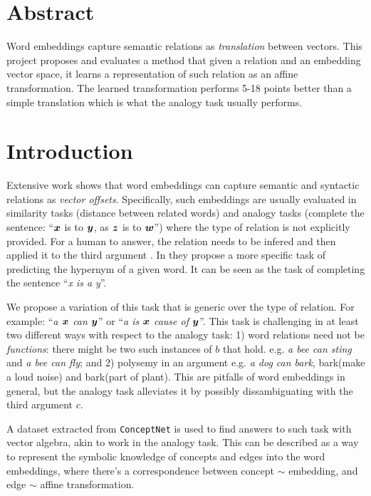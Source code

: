 \noindent
\noindent


\section{Abstract}

Word embeddings capture semantic relations as \emph{translation} between vectors.
This project proposes and evaluates a method that given a relation and an embedding vector space,
it learns a representation of such relation as an affine transformation.
The learned transformation performs 5-18 points better than a simple translation
which is what the analogy task usually performs.

\section{Introduction}

Extensive work shows that word embeddings can capture semantic and syntactic relations
\cite{mikolov2013efficient} \cite{mikolov2013linguistic} \cite{levy2014linguistic}
as \textit{vector offsets}.
Specifically, such embeddings are usually evaluated in
similarity tasks (distance between related words)
and analogy tasks (complete the sentence: ``$\boldsymbol{x}$ is to $\boldsymbol{y}$, as $\boldsymbol{z}$ is to $\boldsymbol{w}$'')
where the type of relation is not explicitly provided.
For a human to answer, the relation
needs to be infered and then applied it to the third argument \cite{levy2014linguistic}.
In \cite{nayak2015learning} they propose a more specific task of
predicting the hypernym of a given word.
It can be seen as the task of completing the sentence ``\emph{x is a y}''.

We propose a variation of this task that is generic over the type of relation.
For example: ``\emph{a $\boldsymbol{x}$ can $\boldsymbol{y}$}'' or ``\emph{a is $\boldsymbol{x}$ cause of $\boldsymbol{y}$}''.
This task is challenging in at least two different ways with respect to the analogy task:
1) word relations need not be \textit{functions}: there might be two such instances of $b$ that
hold. e.g. \textit{a bee can sting} and \textit{a bee can fly}; and
2) polysemy in an argument e.g. \textit{a dog can bark}, bark(make a loud noise) and bark(part of plant).
This are pitfalls of word embeddings in general, but the analogy task alleviates it
by possibly dissambiguating with the third argument $c$.

A dataset extracted from \texttt{ConceptNet} is used to find answers to
such task with vector algebra, akin to work in the analogy task.
This can be described as a way to represent the symbolic knowledge of concepts
and edges into the word embeddings, where there's a correspondence between concept $\sim$ embedding,
and edge $\sim$ affine transformation.

